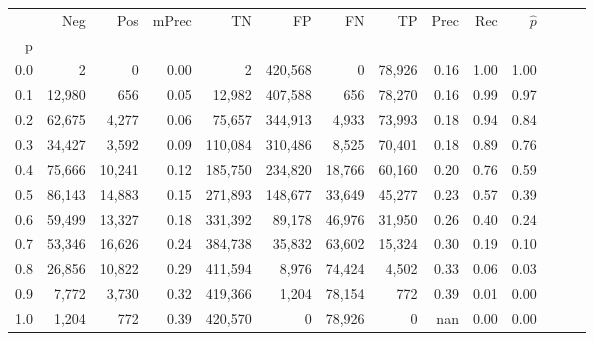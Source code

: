\begin{tabular}{rrrrrrrrrrrrrr}
\toprule
{} &     Neg &     Pos & mPrec &       TN &       FP &      FN &      TP &  Prec &   Rec & $\hat{p}$ \\
p   &         &         &       &          &          &         &         &       &       &           \\
\midrule
0.0 &       2 &       0 &  0.00 &        2 &  420,568 &       0 &  78,926 &  0.16 &  1.00 &      1.00 \\
0.1 &  12,980 &     656 &  0.05 &   12,982 &  407,588 &     656 &  78,270 &  0.16 &  0.99 &      0.97 \\
0.2 &  62,675 &   4,277 &  0.06 &   75,657 &  344,913 &   4,933 &  73,993 &  0.18 &  0.94 &      0.84 \\
0.3 &  34,427 &   3,592 &  0.09 &  110,084 &  310,486 &   8,525 &  70,401 &  0.18 &  0.89 &      0.76 \\
0.4 &  75,666 &  10,241 &  0.12 &  185,750 &  234,820 &  18,766 &  60,160 &  0.20 &  0.76 &      0.59 \\
0.5 &  86,143 &  14,883 &  0.15 &  271,893 &  148,677 &  33,649 &  45,277 &  0.23 &  0.57 &      0.39 \\
0.6 &  59,499 &  13,327 &  0.18 &  331,392 &   89,178 &  46,976 &  31,950 &  0.26 &  0.40 &      0.24 \\
0.7 &  53,346 &  16,626 &  0.24 &  384,738 &   35,832 &  63,602 &  15,324 &  0.30 &  0.19 &      0.10 \\
0.8 &  26,856 &  10,822 &  0.29 &  411,594 &    8,976 &  74,424 &   4,502 &  0.33 &  0.06 &      0.03 \\
0.9 &   7,772 &   3,730 &  0.32 &  419,366 &    1,204 &  78,154 &     772 &  0.39 &  0.01 &      0.00 \\
1.0 &   1,204 &     772 &  0.39 &  420,570 &        0 &  78,926 &       0 &   nan &  0.00 &      0.00 \\
\bottomrule
\end{tabular}
